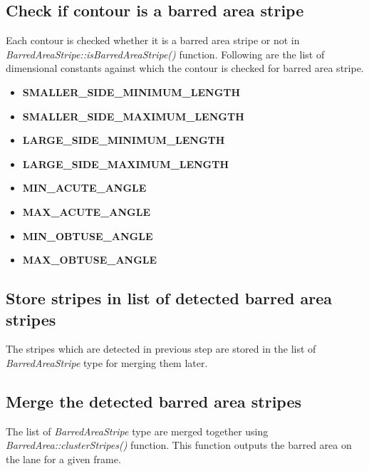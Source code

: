 \subsection{Check if contour is a barred area stripe}
\label{sec:BarredAreaStripeChecking}
Each contour is checked whether it is a barred area stripe or not in \emph{BarredAreaStripe::isBarredAreaStripe()} function. Following are the list of dimensional constants against which the contour is checked for barred area stripe.
\begin{itemize}
    \item {\small \textbf{SMALLER\_SIDE\_MINIMUM\_LENGTH}}
    \item {\small \textbf{SMALLER\_SIDE\_MAXIMUM\_LENGTH}}
    \item {\small \textbf{LARGE\_SIDE\_MINIMUM\_LENGTH}}
    \item {\small \textbf{LARGE\_SIDE\_MAXIMUM\_LENGTH}}
    \item {\small \textbf{MIN\_ACUTE\_ANGLE}}
    \item {\small \textbf{MAX\_ACUTE\_ANGLE}}
    \item {\small \textbf{MIN\_OBTUSE\_ANGLE}}
    \item {\small \textbf{MAX\_OBTUSE\_ANGLE}}
\end{itemize}

\subsection{Store stripes in list of detected barred area stripes}
The stripes which are detected in previous step are stored in the list of \emph{BarredAreaStripe} type for merging them later.

\subsection{Merge the detected barred area stripes}
The list of \emph{BarredAreaStripe} type are merged together using \\\emph{BarredArea::clusterStripes()} function. This function outputs the barred area on the lane for a given frame.

\newpage

